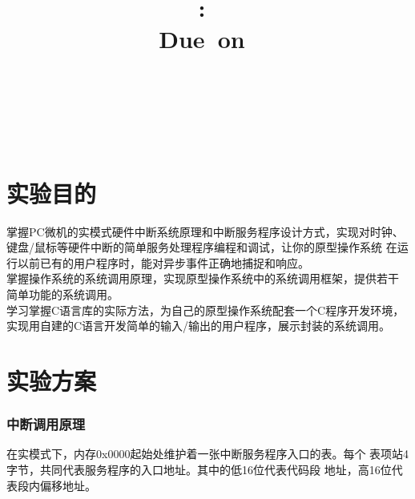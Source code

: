 \documentclass[a4paper]{article}
\title{
\vspace{2in}
\textmd{\textbf{\hmwkClass:\ \hmwkTitle}}\\
\normalsize\vspace{0.1in}\small{Due\ on\ \hmwkDueDate}\\
\vspace{0.1in}\large{\textit{\hmwkClassInstructor\ \hmwkClassTime}}
\vspace{3in}
}
\author{\textbf{\LARGE{\hmwkAuthorName}} \\ \\ \textbf{\LARGE{\hmwkAuthorId}}}
\date{} %
\begin{document}

\maketitle




\renewcommand{\contentsname}{Content} %
\newpage
\tableofcontents
{}
\newpage



\section{实验目的}
掌握PC微机的实模式硬件中断系统原理和中断服务程序设计方式，实现对时钟、
键盘/鼠标等硬件中断的简单服务处理程序编程和调试，让你的原型操作系统
在运行以前已有的用户程序时，能对异步事件正确地捕捉和响应。\\

掌握操作系统的系统调用原理，实现原型操作系统中的系统调用框架，提供若干
简单功能的系统调用。 \\

学习掌握C语言库的实际方法，为自己的原型操作系统配套一个C程序开发环境，
实现用自建的C语言开发简单的输入/输出的用户程序，展示封装的系统调用。
\section{实验方案}
    \subsubsection{中断调用原理}
    在实模式下，内存0x0000起始处维护着一张中断服务程序入口的表。每个
    表项站4字节，共同代表服务程序的入口地址。其中的低16位代表代码段
    地址，高16位代表段内偏移地址。\\
    
\end{document}
